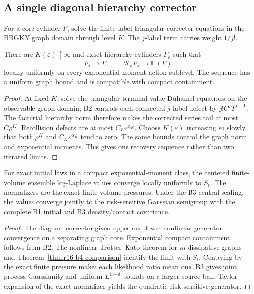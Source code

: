 \subsection{A single diagonal hierarchy corrector}

For a core cylinder \(F\), solve the finite-label triangular corrector equations
in the BBGKY graph domain through level \(K\).  The \(j\)-label term carries
weight \(1/j!\).

\begin{theorem}
\label{thm:r16-b4-corrector}
There are \(K(\varepsilon)\uparrow\infty\) and exact hierarchy cylinders
\(F_\varepsilon\) such that
\[
 F_\varepsilon\to F,
 \qquad
 \mathscr H_\varepsilon F_\varepsilon
 \to\mathbb H(F)
\]
locally uniformly on every exponential-moment action sublevel.  The sequence
has a uniform graph bound and is compatible with compact containment.
\end{theorem}

\begin{proof}
At fixed \(K\), solve the triangular terminal-value Duhamel equations on the
observable graph domain; B2 controls each connected \(j\)-label defect by
\(j!C^jT^{j-1}\).  The factorial hierarchy norm therefore makes the corrected
series tail at most \(C\rho^K\).  Recollision defects are at most
\(C_K\varepsilon^{\alpha_K}\).  Choose \(K(\varepsilon)\) increasing so slowly
that both \(\rho^K\) and \(C_K\varepsilon^{\alpha_K}\) tend to zero.  The same
bounds control the graph norm and exponential moments.  This gives one
recovery sequence rather than two iterated limits.
\end{proof}

\begin{theorem}
\label{thm:r16-b4-limit}
For exact initial laws in a compact exponential-moment class, the centered
finite-volume ensemble log-Laplace values converge locally uniformly to
\(S_t\).  The normalizers are the exact finite-volume pressures.  Under the B3
central scaling, the values converge jointly to the risk-sensitive Gaussian
semigroup with the complete B1 initial and B3 density/contact covariance.
\end{theorem}

\begin{proof}
The diagonal corrector gives upper and lower nonlinear generator convergence
on a separating graph core.  Exponential compact containment follows from B2.
The nonlinear Trotter--Kato theorem for \(m\)-dissipative graphs and
Theorem~\ref{thm:r16-b4-comparison} identify the limit with \(S_t\).
Centering by the exact finite pressure makes each likelihood ratio mean one.
B3 gives joint process Gaussianity and uniform \(L^{1+\delta}\) bounds on a
larger source ball; Taylor expansion of the exact normalizer yields the
quadratic risk-sensitive generator.
\end{proof}

